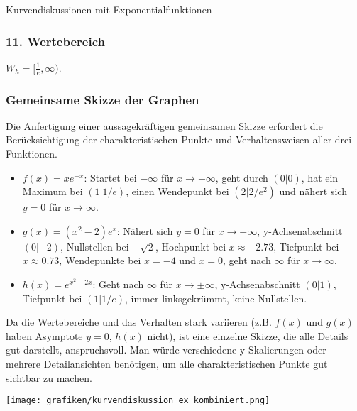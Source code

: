 \begin{loesungsumgebung}{Kurvendiskussionen mit Exponentialfunktionen}
\begin{enumerate}[label=(\alph*)]
    \subsubsection*{11. Wertebereich}
    $W_h = [\frac{1}{e}, \infty)$.
\end{enumerate}

\subsubsection*{Gemeinsame Skizze der Graphen}
Die Anfertigung einer aussagekräftigen gemeinsamen Skizze erfordert die Berücksichtigung der charakteristischen Punkte und Verhaltensweisen aller drei Funktionen.
\begin{itemize}
    \item $f(x)=xe^{-x}$: Startet bei $-\infty$ für $x \to -\infty$, geht durch $(0|0)$, hat ein Maximum bei $(1|1/e)$, einen Wendepunkt bei $(2|2/e^2)$ und nähert sich $y=0$ für $x \to \infty$.
    \item $g(x)=(x^2-2)e^x$: Nähert sich $y=0$ für $x \to -\infty$, y-Achsenabschnitt $(0|-2)$, Nullstellen bei $\pm\sqrt{2}$, Hochpunkt bei $x \approx -2.73$, Tiefpunkt bei $x \approx 0.73$, Wendepunkte bei $x=-4$ und $x=0$, geht nach $\infty$ für $x \to \infty$.
    \item $h(x)=e^{x^2-2x}$: Geht nach $\infty$ für $x \to \pm\infty$, y-Achsenabschnitt $(0|1)$, Tiefpunkt bei $(1|1/e)$, immer linksgekrümmt, keine Nullstellen.
\end{itemize}
Da die Wertebereiche und das Verhalten stark variieren (z.B. $f(x)$ und $g(x)$ haben Asymptote $y=0$, $h(x)$ nicht), ist eine einzelne Skizze, die alle Details gut darstellt, anspruchsvoll. Man würde verschiedene y-Skalierungen oder mehrere Detailansichten benötigen, um alle charakteristischen Punkte gut sichtbar zu machen.

\begin{center}
\texttt{[image: grafiken/kurvendiskussion\_ex\_kombiniert.png]}
\label{fig:kurvendiskussion_ex_kombiniert}
\end{center}

\end{loesungsumgebung}




